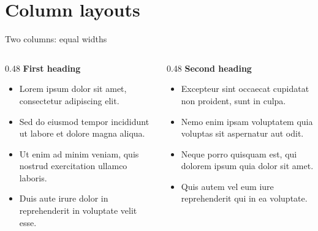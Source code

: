\section{Column layouts}

\begin{frame}[t]{Two columns: equal widths}
    \begin{columns}[T,onlytextwidth]
        \begin{column}{0.48\textwidth}
            \textbf{First heading}
            \begin{itemize}
                \item Lorem ipsum dolor sit amet, consectetur adipiscing elit.
                \item Sed do eiusmod tempor incididunt ut labore et dolore magna aliqua.
                \item Ut enim ad minim veniam, quis nostrud exercitation ullamco laboris.
                \item Duis aute irure dolor in reprehenderit in voluptate velit esse.
            \end{itemize}
        \end{column}
        \begin{column}{0.48\textwidth}
            \textbf{Second heading}
            \begin{itemize}
                \item Excepteur sint occaecat cupidatat non proident, sunt in culpa.
                \item Nemo enim ipsam voluptatem quia voluptas sit aspernatur aut odit.
                \item Neque porro quisquam est, qui dolorem ipsum quia dolor sit amet.
                \item Quis autem vel eum iure reprehenderit qui in ea voluptate.
            \end{itemize}
        \end{column}
    \end{columns}
\end{frame}

